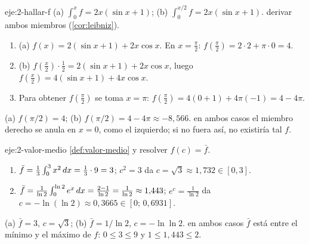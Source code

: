 \begin{solucion}{eje:2-hallar-f}
\datos (a) $\int_0^{x}f=2x(\sin x+1)$; (b) $\int_0^{x/2}f=2x(\sin x+1)$.
\planteamiento derivar ambos miembros (\cref{cor:leibniz}).
\pasos
\begin{enumerate}[label=\arabic*.]
  \item (a) $f(x)=2(\sin x+1)+2x\cos x$. En $x=\frac\pi2$: $f(\frac\pi2)=2\cdot2+\pi\cdot0=4$.
  \item (b) $f(\frac x2)\cdot\frac12=2(\sin x+1)+2x\cos x$, luego $f(\frac x2)=4(\sin x+1)+4x\cos x$.
  \item Para obtener $f(\frac\pi2)$ se toma $x=\pi$: $f(\frac\pi2)=4(0+1)+4\pi(-1)=4-4\pi$.
\end{enumerate}
\resultado (a) $f(\pi/2)=4$; (b) $f(\pi/2)=4-4\pi\approx-8{,}566$.
\comprobacion en ambos casos el miembro derecho se anula en $x=0$, como el izquierdo; si no fuera así, no existiría tal $f$.
\end{solucion}

\begin{solucion}{eje:2-valor-medio}
\planteamiento \cref{def:valor-medio} y resolver $f(c)=\bar f$.
\pasos
\begin{enumerate}[label=(\alph*)]
  \item $\bar f=\frac13\int_0^{3}x^{2}\mathop{}\!d x=\frac13\cdot9=3$; $c^{2}=3$ da $c=\sqrt3\approx1{,}732\in[0,3]$.
  \item $\bar f=\frac{1}{\ln2}\int_0^{\ln2}e^{x}\mathop{}\!d x=\frac{2-1}{\ln2}=\frac{1}{\ln2}\approx1{,}443$; $e^{c}=\frac{1}{\ln2}$ da $c=-\ln(\ln2)\approx0{,}3665\in[0;\,0{,}6931]$.
\end{enumerate}
\resultado (a) $\bar f=3$, $c=\sqrt3$; (b) $\bar f=1/\ln2$, $c=-\ln\ln2$.
\comprobacion en ambos casos $\bar f$ está entre el mínimo y el máximo de $f$: $0\le3\le9$ y $1\le1{,}443\le2$.
\end{solucion}

